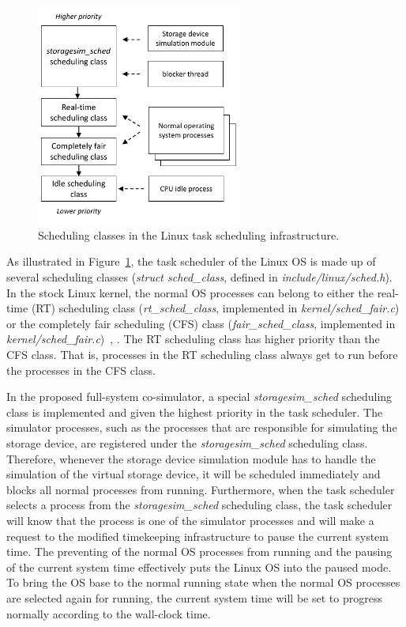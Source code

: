 \begin{figure}[htpb]
	\centering
	\includegraphics[width=0.6\textwidth]{figures/ch5-scheduling-classes.pdf}
	\caption{\label{fig:ch5-scheduling-classes}Scheduling classes in the Linux task scheduling infrastructure.}
\end{figure}

As illustrated in Figure~\ref{fig:ch5-scheduling-classes}, the task scheduler of the Linux OS is made up of several scheduling classes (\textit{struct sched_class}, defined in \textit{include/linux/sched.h}). In the stock Linux kernel, the normal OS processes can belong to either the real-time (RT) scheduling class (\textit{rt_sched_class}, implemented in \textit{kernel/sched_fair.c}) or the completely fair scheduling (CFS) class (\textit{fair_sched_class}, implemented in \textit{kernel/sched_fair.c})~\cite{Bovet:2005}, \cite{Love:2010}. The RT scheduling class has higher priority than the CFS class. That is, processes in the RT scheduling class always get to run before the processes in the CFS class.

In the proposed full-system co-simulator, a special \textit{storagesim_sched} scheduling class is implemented and given the highest priority in the task scheduler. The simulator processes, such as the processes that are responsible for simulating the storage device, are registered under the \textit{storagesim_sched} scheduling class. Therefore, whenever the storage device simulation module has to handle the simulation of the virtual storage device, it will be scheduled immediately and blocks all normal processes from running. Furthermore, when the task scheduler selects a process from the \textit{storagesim_sched} scheduling class, the task scheduler will know that the process is one of the simulator processes and will make a request to the modified timekeeping infrastructure to pause the current system time. The preventing of the normal OS processes from running and the pausing of the current system time effectively puts the Linux OS into the paused mode. To bring the OS base to the normal running state when the normal OS processes are selected again for running, the current system time will be set to progress normally according to the wall-clock time.

